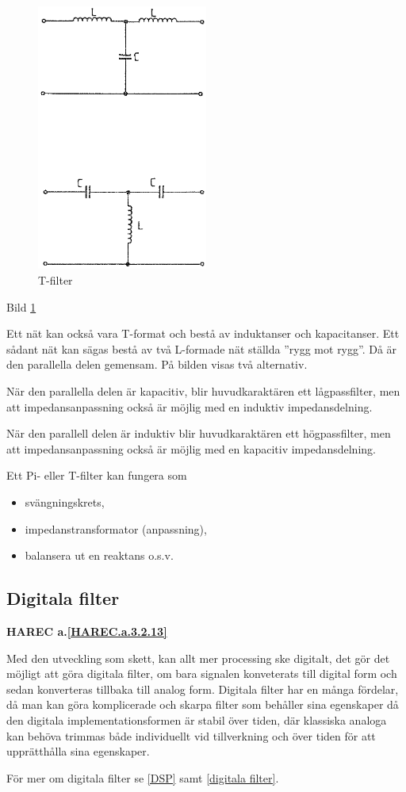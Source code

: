 \begin{figure}
\includegraphics[width=0.5\textwidth]{images/bild_2_3-33.png}
\caption{T-filter}
\label{fig:BildII3-33}
\end{figure}

Bild \ref{fig:BildII3-33}

Ett nät kan också vara T-format och bestå av induktanser och kapacitanser. Ett
sådant nät kan sägas bestå av två L-formade nät ställda ''rygg mot rygg''. Då är
den parallella delen gemensam. På bilden visas två alternativ.

När den parallella delen är kapacitiv, blir huvudkaraktären ett lågpassfilter,
men att impedansanpassning också är möjlig med en induktiv impedansdelning.

När den parallell delen är induktiv blir huvudkaraktären ett högpassfilter, men
att impedansanpassning också är möjlig med en kapacitiv impedansdelning.

Ett Pi- eller T-filter kan fungera som
\begin{itemize}
\item svängningskrets,
\item impedanstransformator (anpassning),
\item balansera ut en reaktans o.s.v.
\end{itemize}

\subsection{Digitala filter}
\textbf{HAREC a.\ref{HAREC.a.3.2.13}\label{myHAREC.a.3.2.13}}

Med den utveckling som skett, kan allt mer processing ske digitalt, det gör
det möjligt att göra digitala filter, om bara signalen konveterats till
digital form och sedan konverteras tillbaka till analog form.
Digitala filter har en många fördelar, då man kan göra komplicerade och
skarpa filter som behåller sina egenskaper då den digitala implementationsformen
är stabil över tiden, där klassiska analoga kan behöva trimmas både
individuellt vid tillverkning och över tiden för att upprätthålla sina
egenskaper.

För mer om digitala filter se \ref{DSP} samt \ref{digitala filter}.
